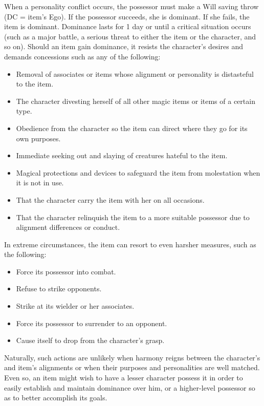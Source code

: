 When a personality conflict occurs, the possessor must make a Will saving throw (DC = item's Ego). If the possessor succeeds, she is dominant. If she fails, the item is dominant. Dominance lasts for 1 day or until a critical situation occurs (such as a major battle, a serious threat to either the item or the character, and so on). Should an item gain dominance, it resists the character's desires and demands concessions such as any of the following:
				\begin{itemize}\item  Removal of associates or items whose alignment or personality is distasteful to the item.
				\item  The character divesting herself of all other magic items or items of a certain type.
				\item  Obedience from the character so the item can direct where they go for its own purposes.
				\item  Immediate seeking out and slaying of creatures hateful to the item.
				\item  Magical protections and devices to safeguard the item from molestation when it is not in use.
				\item   That the character carry the item with her on all occasions.
				\item  That the character relinquish the item to a more suitable possessor due to alignment differences or conduct.
\end{itemize}
				
In extreme circumstances, the item can resort to even harsher measures, such as the following:
				\begin{itemize}\item  Force its possessor into combat.
				\item  Refuse to strike opponents.
				\item  Strike at its wielder or her associates.
				\item  Force its possessor to surrender to an opponent.
				\item  Cause itself to drop from the character's grasp.
\end{itemize}
				
Naturally, such actions are unlikely when harmony reigns between the character's and item's alignments or when their purposes and personalities are well matched. Even so, an item might wish to have a lesser character possess it in order to easily establish and maintain dominance over him, or a higher-level possessor so as to better accomplish its goals.
				
